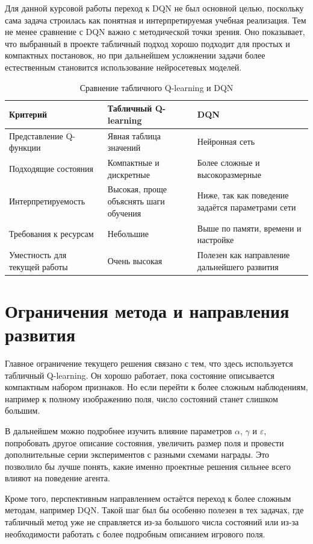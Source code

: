 Для данной курсовой работы переход к DQN не был основной целью, поскольку сама задача строилась как понятная и интерпретируемая учебная реализация. Тем не менее сравнение с DQN важно с методической точки зрения. Оно показывает, что выбранный в проекте табличный подход хорошо подходит для простых и компактных постановок, но при дальнейшем усложнении задачи более естественным становится использование нейросетевых моделей.

\begin{table}[H]
    \centering
    \caption{Сравнение табличного Q-learning и DQN}
    \begin{tabularx}{\textwidth}{>{\raggedright\arraybackslash}p{} X X}
        \toprule
        Критерий & Табличный Q-learning & DQN \\
        \midrule
        Представление Q-функции & Явная таблица значений & Нейронная сеть \\
        Подходящие состояния & Компактные и дискретные & Более сложные и высокоразмерные \\
        Интерпретируемость & Высокая, проще объяснять шаги обучения & Ниже, так как поведение задаётся параметрами сети \\
        Требования к ресурсам & Небольшие & Выше по памяти, времени и настройке \\
        Уместность для текущей работы & Очень высокая & Полезен как направление дальнейшего развития \\
        \bottomrule
    \end{tabularx}
\end{table}

\section{Ограничения метода и направления развития}

Главное ограничение текущего решения связано с тем, что здесь используется табличный Q-learning. Он хорошо работает, пока состояние описывается компактным набором признаков. Но если перейти к более сложным наблюдениям, например к полному изображению поля, число состояний станет слишком большим.

В дальнейшем можно подробнее изучить влияние параметров $\alpha$, $\gamma$ и $\varepsilon$, попробовать другое описание состояния, увеличить размер поля и провести дополнительные серии экспериментов с разными схемами награды. Это позволило бы лучше понять, какие именно проектные решения сильнее всего влияют на поведение агента.

Кроме того, перспективным направлением остаётся переход к более сложным методам, например DQN. Такой шаг был бы особенно полезен в тех задачах, где табличный метод уже не справляется из-за большого числа состояний или из-за необходимости работать с более подробным описанием игрового поля.

